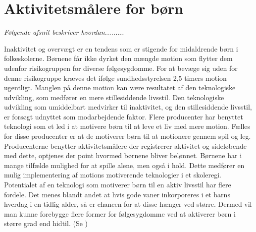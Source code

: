 \newpage
\section{Aktivitetsmålere for børn} \label{tracker_intro}
\textit{Følgende afsnit beskriver hvordan......... }

Inaktivitet og overvægt er en tendens som er stigende for midaldrende børn i folkeskolerne. Børnene får ikke dyrket den mængde motion som flytter dem udenfor risikogruppen for diverse følgesygdomme. For at bevæge sig uden for denne risikogruppe kræves det ifølge sundhedsstyrelsen 2,5 timers motion ugentligt. Manglen på denne motion kan være resultatet af den teknologiske udvikling, som medfører en mere stillesiddende livsstil. \citep{ObesityActionCoalition}  \newline 
Den teknologiske udvikling som umiddelbart medvirker til inaktivitet, og den stillesiddende livsstil, er forsøgt udnyttet som modarbejdende faktor. Flere producenter har benyttet teknologi som et led i at motivere børn til at leve et liv med mere motion. Fælles for disse producenter er at de motiverer børn til at motionere gennem spil og leg. Producenterne benytter aktivitetsmålere der registrerer aktivitet og sideløbende med dette, optjenes der point hvormed børnene bliver belønnet. Børnene har i mange tilfælde mulighed for at spille alene, men også i hold. Dette medfører en mulig implementering af motions motiverende teknologier i et skoleregi. \newline
Potentialet af en teknologi som motiverer børn til en aktiv livsstil har flere fordele. Det menes blandt andet at hvis gode vaner inkorporeres i et barns hverdag i en tidlig alder, så er chancen for at disse hænger ved større. Dermed vil man kunne forebygge flere former for følgesygdomme ved at aktiverer børn i større grad end hidtil. (Se )

